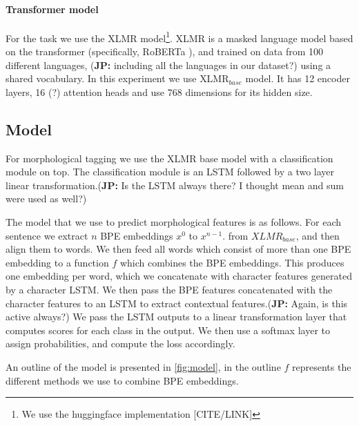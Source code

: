\documentclass[11pt]{article}
\newcommand\jp[1]{(\textbf{JP:} #1)}
\begin{document}
	\paragraph{Transformer model}
	For the task we use the XLMR \citep{conneau2019unsupervised}
        model\footnote{We use the huggingface implementation
          [CITE/LINK]}. XLMR is a masked language model based on the
        transformer (specifically, RoBERTa \citep{liu2019roberta}),
        and trained on data from 100 different languages,
        \jp{including all the languages in our dataset?} using a
        shared vocabulary. In this experiment we use
        \textsc{XLMR}$_{base}$ model. It has 12 encoder layers, 16 (?)
        attention heads and use 768 dimensions for its hidden size.
	
	\subsection{Model}
	For morphological tagging we use the XLMR base model with a
        classification module on top. The classification module is an
        LSTM followed by a two layer linear transformation.\jp{Is the
          LSTM always there? I thought mean and sum were used as
          well?}
	
	The model that we use to predict morphological features is as
        follows. For each sentence we extract $n$ BPE embeddings $x^0$
        to $x^{n-1}$. from $XLMR_{base}$, and then align them to
        words.  We then feed all words which consist of more than one
        BPE embedding to a function $f$ which combines the BPE
        embeddings. This produces one embedding per word, which we
        concatenate with character features generated by a character
        LSTM. We then pass the BPE features concatenated with the
        character features to an LSTM to extract contextual
        features.\jp{Again, is this active always?}  We pass the LSTM
        outputs to a linear transformation layer that computes scores
        for each class in the output. We then use a softmax layer to
        assign probabilities, and compute the loss accordingly.
	
	An outline of the model is presented in \cref{fig:model}, in
        the outline $f$ represents the different methods we use to
        combine BPE embeddings.
	
\end{document}

